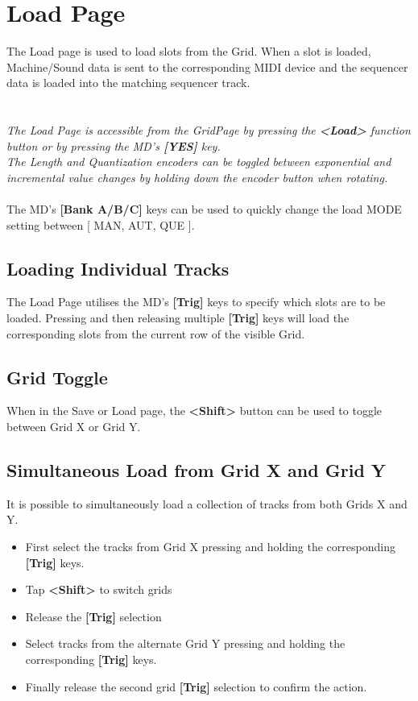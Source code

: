 \chapter{Load Page}
The Load page is used to load slots from the Grid. When a slot is loaded, Machine/Sound data is sent to the corresponding MIDI device and the sequencer data is loaded into the matching sequencer track.\\
\\
\\
\textit{The Load Page is accessible from the GridPage by pressing the  \textbf{<Load>} function button or by pressing the MD's \textbf{[YES]} key.}
\\
\textit{The Length and Quantization encoders can be toggled between exponential and incremental value changes by holding down the encoder button when rotating.}
\\\\
The MD's \textbf{[Bank A/B/C]} keys can be used to quickly change the load MODE setting between [ MAN, AUT, QUE ].
\newpage
\section{Loading Individual Tracks}
The Load Page utilises the MD's \textbf{[Trig]} keys to specify which slots are to be loaded. Pressing and then releasing multiple \textbf{[Trig]} keys will load the corresponding slots from the current row of the visible Grid.
\section{Grid Toggle}
When in the Save or Load page, the \textbf{<Shift>} button can be used to toggle between Grid X or Grid Y.
\section{Simultaneous Load from Grid X and Grid Y}
It is possible to simultaneously load a collection of tracks from both Grids X and Y. 
\begin{itemize}
\item First select the tracks from Grid X pressing and holding the corresponding \textbf{[Trig]} keys.
\item Tap \textbf{<Shift>} to switch grids
\item Release the \textbf{[Trig]} selection
\item Select tracks from the alternate Grid Y pressing and holding the corresponding \textbf{[Trig]} keys. 
\item Finally release the second grid \textbf{[Trig]} selection to confirm the action. 
\end{itemize}


